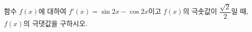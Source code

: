 함수 $f(x)$에 대하여 $f'(x)=\sin 2x-\cos 2x$이고 $f(x)$의 극솟값이 $\dfrac{\sqrt{2}}{2}$일 때, $f(x)$의 극댓값을 구하시오. 
